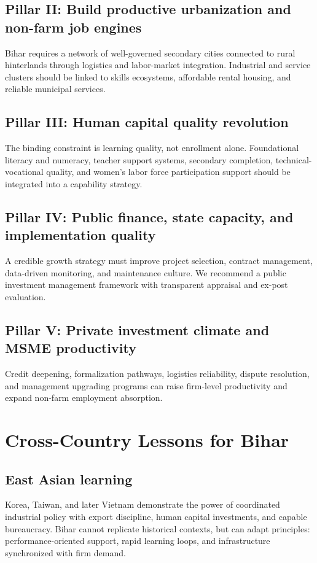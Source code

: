 \documentclass[preprint,12pt]{elsarticle}
\begin{document}
\subsection{Pillar II: Build productive urbanization and non-farm job engines}
Bihar requires a network of well-governed secondary cities connected to rural hinterlands through logistics and labor-market integration. Industrial and service clusters should be linked to skills ecosystems, affordable rental housing, and reliable municipal services.

\subsection{Pillar III: Human capital quality revolution}
The binding constraint is learning quality, not enrollment alone. Foundational literacy and numeracy, teacher support systems, secondary completion, technical-vocational quality, and women's labor force participation support should be integrated into a capability strategy.

\subsection{Pillar IV: Public finance, state capacity, and implementation quality}
A credible growth strategy must improve project selection, contract management, data-driven monitoring, and maintenance culture. We recommend a public investment management framework with transparent appraisal and ex-post evaluation.

\subsection{Pillar V: Private investment climate and MSME productivity}
Credit deepening, formalization pathways, logistics reliability, dispute resolution, and management upgrading programs can raise firm-level productivity and expand non-farm employment absorption.

\section{Cross-Country Lessons for Bihar}
\subsection{East Asian learning}
Korea, Taiwan, and later Vietnam demonstrate the power of coordinated industrial policy with export discipline, human capital investments, and capable bureaucracy. Bihar cannot replicate historical contexts, but can adapt principles: performance-oriented support, rapid learning loops, and infrastructure synchronized with firm demand.
\end{document}
